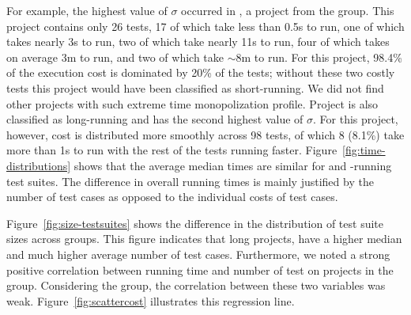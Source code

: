 For example, the highest value of $\sigma$ occurred in
, a project from the \longg{} group.
This project contains only 26 tests, 17 of which take less than 0.5s
to run, one of which takes nearly 3s to run, two of which take nearly
11s to run, four of which takes on average 3m to run, and two of which
take $\sim$8m to run.
For this project, 98.4\% of the execution cost is dominated by 20\% of
the tests; without these two costly tests this project would have been
classified as short-running.
We did not find other projects with such extreme time monopolization
profile.
Project  is also classified as
long-running and has the second highest value of $\sigma$.
For this project, however, cost is distributed more smoothly across 98
tests, of which 8 (8.1\%) take more than 1s to run with the rest of
the tests running faster.
Figure~\ref{fig:time-distributions} shows that the average median
times are similar for \medg{} and \longg{}-running test suites.
The difference in overall running times is mainly justified by the
number of test cases as opposed to the individual costs of test cases.

Figure~\ref{fig:size-testsuites} shows the difference in the
distribution of test suite sizes across groups.  This figure indicates
that long projects, have a higher median and much higher average
number of test cases.
Furthermore, we noted a strong positive correlation between running
time and number of test on projects in the \longg{} group.
Considering the \medg{} group, the correlation between these two
variables was weak.
Figure~\ref{fig:scattercost} illustrates this regression line.

